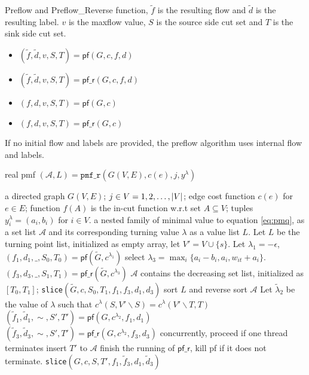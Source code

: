 \documentclass{article}
\begin{document}
Preflow and Preflow\_Reverse function, $\tilde{f}$ is the resulting flow and $\tilde{d}$ is the resulting label. $v$ is the maxflow value, $S$ is the source side cut set and $T$ is the sink side cut set.
\begin{itemize}
\item $(\tilde{f}, \tilde{d}, v, S, T) = \textsf{pf}(G, c, f, d)$
\item $(\tilde{f}, \tilde{d}, v, S, T) = \textsf{pf\_r}(G, c, f, d)$
\item $(f, d, v, S, T) = \textsf{pf}(G, c)$
\item $(f, d, v, S, T) = \textsf{pf\_r}(G, c)$
\end{itemize}	
If no initial flow and labels are provided, the preflow algorithm uses internal flow and labels.
\begin{algorithm}
\caption{real pmf $(\mathcal{A}, L) = \texttt{pmf\_r}(G(V,E), c(e), j, y^{\lambda})$}\label{alg:pmfRC}
\begin{algorithmic}[1]
\REQUIRE a directed graph $G(V, E)$; $j \in V={1,2,\dots, \lvert V\rvert}$; edge cost function $c(e)$ for $e \in E$; function $f(A)$ is the in-cut function w.r.t set $A\subseteq V$; tuples $y^{\lambda}_i = (a_i, b_i)$ for $i \in V$.
\ENSURE a nested family of minimal value to equation \eqref{eq:pmq}, as a set list $\mathcal{A}$ and its corresponding turning value $\lambda$ as a value list $L$.
\STATE Let $L$ be the turning point list, initialized as empty array, let $V'=V\cup\{s\}$.
\STATE Let $ \lambda_1  = -\epsilon$, $(f_1, d_1, \_, S_0, T_0) = \mathsf{pf}(\widetilde{G},c^{\lambda_1})$
\STATE select $\lambda_3 = \max_{i}\{a_i-b_i, a_i, w_{it} + a_i\}$. $(f_3, d_3, \_, S_1, T_1) = \mathsf{pf\_r}(\widetilde{G}, c^{\lambda_3})$\footnotemark 
\STATE $\mathcal{A}$ contains the decreasing set list, initialized as $[T_0, T_1]$;
\STATE \texttt{slice}$(\widetilde{G}, c, S_0, T_1, f_1, f_3, d_1, d_3)$
\STATE sort $L$ and reverse sort $\mathcal{A}$
\STATE Let $\tilde{\lambda}_2$ be the value of $\lambda$ such that $c^{\lambda}(S, V'\backslash S) = 
c^{\lambda}(V'\backslash T, T)$ 
\STATE $(\tilde{f}_1, \tilde{d}_1, \sim, S', T') = \textsf{pf}(G, c^{\lambda_2}, f_1, d_1)$
\STATE $(\tilde{f}_3, \tilde{d}_3, \sim, S', T') = \textsf{pf\_r}(G, c^{\lambda_2}, f_3, d_3)$ concurrently, \STATE proceed if one thread terminates
\STATE insert $T'$ to $\mathcal{A}$
\STATE finish the running of $\textsf{pf\_r}$, kill \textsf{pf} if it does not terminate.
\STATE \texttt{slice}$(G, c, S, T', f_1, \tilde{f}_3, d_1, \tilde{d}_3)$

\end{algorithmic}
\end{algorithm}
\end{document}
